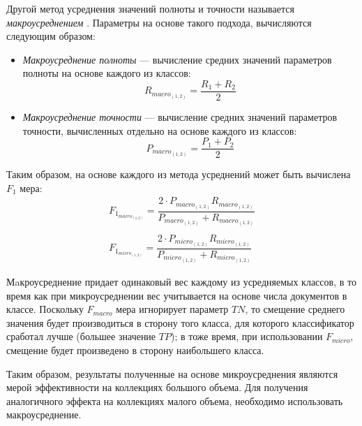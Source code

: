 
    Другой метод усреднения значений полноты и точности называется {\it макроусреднением} \cite{microMacroMeasures}.
    Параметры на основе такого подхода, вычисляются следующим образом:
    \begin{itemize}
        \item {\it Макроусреднение полноты} --- вычисление средних значений параметров
            полноты на основе каждого из классов:
            \begin{equation}
                R_{macro_{(1, 2)}} = \dfrac{R_{1} + R_{2}}{2} \nonumber
            \end{equation}
        \item {\it Макроусреднение точности} --- вычисление средних значений параметров
            точности, вычисленных отдельно на основе каждого из классов:
            \begin{equation}
                P_{macro_{(1, 2)}} = \dfrac{P_{1} + P_{2}}{2} \nonumber
            \end{equation}
    \end{itemize}

    Таким образом, на основе каждого из метода усреднений может быть вычислена
    $F_1$ мера:
    \begin{gather*}
        F_{1_{macro_{(1,2)}}} = \dfrac{2 \cdot P_{macro_{(1,2)}} R_{macro_{(1,2)}} }{P_{macro_{(1,2)}} + R_{macro_{(1,2)}}} \nonumber \\
        \\
        F_{1_{micro_{(1,2)}}} = \dfrac{2 \cdot P_{micro_{(1,2)}} R_{micro_{(1,2)}} }{P_{micro_{(1,2)}} + R_{micro_{(1,2)}}} \nonumber
    \end{gather*}


    Мaкроусреднение придает одинаковый вес каждому из усредняемых классов, в то
    время как при микроусреднении вес учитывается на основе числа документов в
    классе. Поскольку $F_{macro}$ мера игнорирует параметр $TN$, то смещение
    среднего значения будет производиться в сторону того класса, для которого классификатор сработал
    лучше (большее значение $TP$); в тоже время, при использовании $F_{micro}$,
    смещение будет произведено в сторону наибольшего класса. \cite{microMacroMeasures}

    Таким образом, результаты полученные на основе микроусреднения являются мерой
    эффективности на коллекциях большого объема. Для получения аналогичного эффекта
    на коллекциях малого объема, необходимо использовать макроусреднение. \cite{microMacroMeasuresDifferences}

